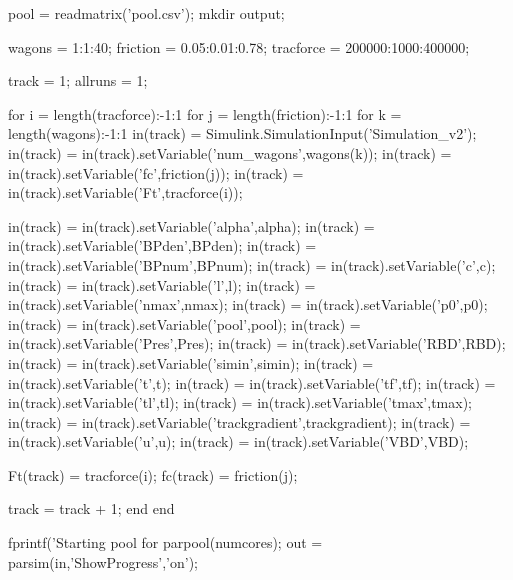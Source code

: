 \begin{matlab}
pool = readmatrix('pool.csv'); %
mkdir output; %

wagons = 1:1:40; %
friction = 0.05:0.01:0.78; %
tracforce = 200000:1000:400000; %

track = 1; %
allruns = 1; %

for i = length(tracforce):-1:1 		%
	for j = length(friction):-1:1 	%
		for k = length(wagons):-1:1 %
			in(track) = Simulink.SimulationInput('Simulation_v2');
			in(track) = in(track).setVariable('num_wagons',wagons(k));
			in(track) = in(track).setVariable('fc',friction(j));
			in(track) = in(track).setVariable('Ft',tracforce(i));
			
			in(track) = in(track).setVariable('alpha',alpha);
			in(track) = in(track).setVariable('BPden',BPden);
			in(track) = in(track).setVariable('BPnum',BPnum);
			in(track) = in(track).setVariable('c',c);
			in(track) = in(track).setVariable('l',l);
			in(track) = in(track).setVariable('nmax',nmax);
			in(track) = in(track).setVariable('p0',p0);
			in(track) = in(track).setVariable('pool',pool);
			in(track) = in(track).setVariable('Pres',Pres);
			in(track) = in(track).setVariable('RBD',RBD);
			in(track) = in(track).setVariable('simin',simin);
			in(track) = in(track).setVariable('t',t);
			in(track) = in(track).setVariable('tf',tf);
			in(track) = in(track).setVariable('tl',tl);
			in(track) = in(track).setVariable('tmax',tmax);
			in(track) = in(track).setVariable('trackgradient',trackgradient);
			in(track) = in(track).setVariable('u',u);
			in(track) = in(track).setVariable('VBD',VBD);
			
			Ft(track) = tracforce(i);
			fc(track) = friction(j);
			
			track = track + 1;       
		end
	end
	
	fprintf('Starting pool for %
	parpool(numcores); %
	out = parsim(in,'ShowProgress','on'); 	
											

\end{matlab}
